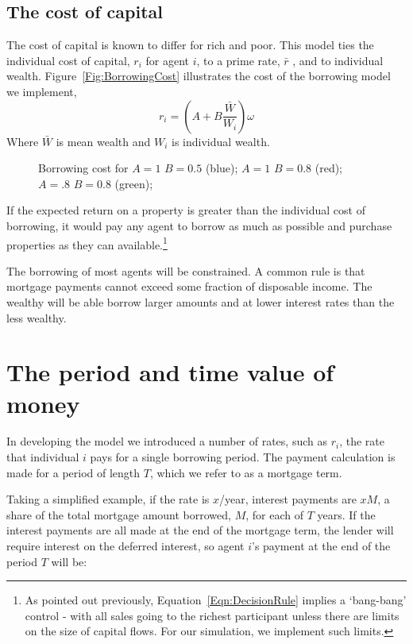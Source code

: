 \subsection{The cost of capital}
The cost of capital is known to differ for rich and poor. This model ties the individual cost of capital,  $r_i$ for agent $i$, to a prime rate, $\bar r$ , and to individual wealth. Figure~\ref{Fig:BorrowingCost} illustrates the cost of the borrowing model we implement, 
 \[ r_i = (A + B \frac{\bar{W}}{W_i})\omega\]
Where $\bar{W}$ is mean wealth and $W_i$ is individual wealth. 
\begin{figure}[htbp]
\begin{center}
\caption{Borrowing cost for  $A=1$  $B=0.5$ (blue);  $A=1$  $B=0.8$ (red);  $A=.8$  $B=0.8$ (green);}
\label{Fig:CapitalCost}
\end{center}
\end{figure}
If the expected return on a property is greater than the individual cost of borrowing, it would pay any agent to borrow as much as possible and purchase properties as they can available.\footnote{As pointed out previously,  Equation~\ref{Eqn:DecisionRule} implies a `bang-bang' control - with all sales going to the richest participant unless there are limits on the size of capital flows. For our simulation, we implement such limits. } 
 
The borrowing of most agents will be constrained. A common rule is that mortgage payments cannot exceed some fraction of disposable income. The wealthy will be able borrow larger amounts and at lower interest rates than the less wealthy. 



\section{The period and time value of money}
In developing the model we introduced a number of rates, such as $r_i$, the rate that individual $i$ pays for a single borrowing period. The payment calculation is made for a period of length $T$, which we refer to as a mortgage term.

Taking a simplified example, if the rate is $x$/year, interest payments are $xM$, a share of the total mortgage amount borrowed, $M$, for each of $T$ years. 
If the interest payments are all made at the end of the mortgage term, the lender will require interest on the deferred interest, so agent $i$'s payment at the end of the period $T$ will be:

